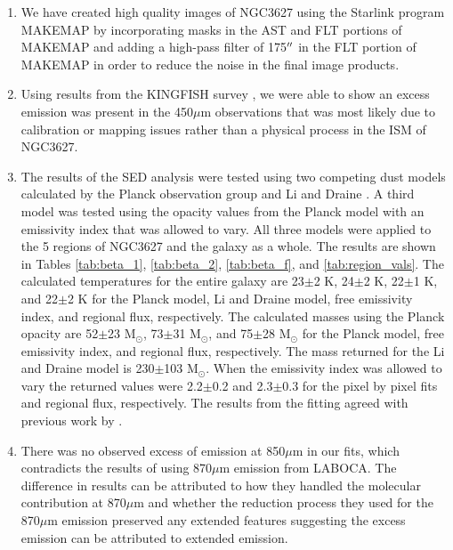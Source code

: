 \begin{enumerate}

\item{We have created high quality images of NGC3627 using the Starlink program MAKEMAP by incorporating masks in the AST and FLT portions of MAKEMAP and adding a high-pass filter of 175$\mbox{$^{\prime\prime}$}$ in the FLT portion of MAKEMAP in order to reduce the noise in the final image products.}

\item{Using results from the KINGFISH survey \citep{kennicutt2011}, we were able to show an excess emission was present in the 450$\mu$m observations that was most likely due to calibration or mapping issues rather than a physical process in the ISM of NGC3627.}

\item{The results of the SED analysis were tested using two competing dust models calculated by the Planck observation group \citep{planckxxv2011} and Li and Draine \citep{li2001}.  A third model was tested using the opacity values from the Planck model with an emissivity index that was allowed to vary.  All three models were applied to the 5 regions of NGC3627 and the galaxy as a whole.  The results are shown in Tables \ref{tab:beta_1}, \ref{tab:beta_2}, \ref{tab:beta_f}, and \ref{tab:region_vals}.  The calculated temperatures for the entire galaxy are 23$\pm$2 K, 24$\pm$2 K, 22$\pm$1 K, and 22$\pm$2 K for the Planck model, Li and Draine model, free emissivity index, and regional flux, respectively.  The calculated masses using the Planck opacity are 52$\pm$23 M$_\odot$, 73$\pm$31 M$_\odot$, and 75$\pm$28 M$_\odot$ for the Planck model, free emissivity index, and regional flux, respectively.  The mass returned for the Li and Draine model is 230$\pm$103 M$_\odot$.  When the emissivity index was allowed to vary the returned values were 2.2$\pm$0.2 and 2.3$\pm$0.3 for the pixel by pixel fits and regional flux, respectively.  The results from the fitting agreed with previous work by \cite{galametz2012}.}

\item{There was no observed excess of emission at 850$\mu$m in our fits, which contradicts the results of \cite{galametz2014} using 870$\mu$m emission from LABOCA.  The difference in results can be attributed to how they handled the molecular contribution at 870$\mu$m and whether the reduction process they used for the 870$\mu$m emission preserved any extended features suggesting the excess emission can be attributed to extended emission.}


\end{enumerate}
